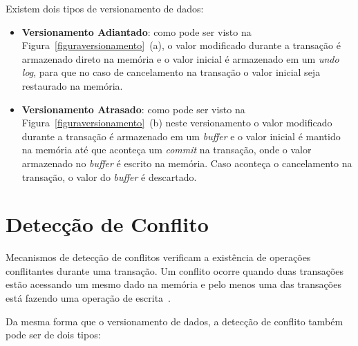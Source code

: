 \documentclass[diss,capa]{texufpel}
\begin{document}
Existem dois tipos de versionamento de dados:

\begin{itemize}
 \item \textbf{Versionamento Adiantado}: como pode ser visto na Figura~\ref{figuraversionamento}~(a), o valor modificado durante a transação é armazenado direto na memória e o valor inicial é armazenado em um \emph{undo log}, para que no caso de cancelamento na transação o valor inicial seja restaurado na memória.

 \item \textbf{Versionamento Atrasado}: como pode ser visto na Figura~\ref{figuraversionamento}~(b) neste versionamento o valor modificado durante a transação é armazenado em um \emph{buffer} e o valor inicial é mantido na memória até que aconteça um \emph{commit} na transação, onde o valor armazenado no \emph{buffer} é escrito na memória. Caso aconteça o cancelamento na transação, o valor do \emph{buffer} é descartado.
\end{itemize}

\section{Detecção de Conflito}

Mecanismos de detecção de conflitos verificam a existência de operações conflitantes durante uma transação. Um conflito ocorre quando duas transações estão acessando um mesmo dado na memória e pelo menos uma das transações está fazendo uma operação de escrita~\cite{BaldassinTese2009}.

Da mesma forma que o versionamento de dados, a detecção de conflito também pode ser de dois tipos:
\end{document}
